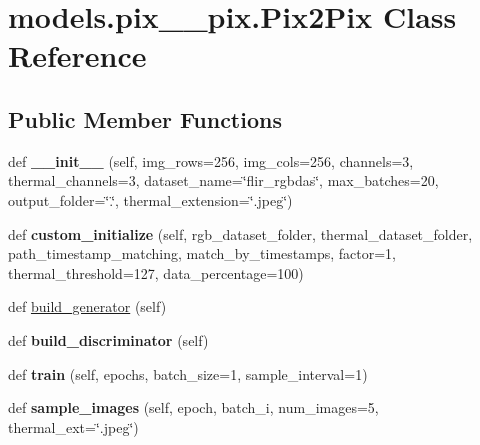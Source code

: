 \hypertarget{classmodels_1_1pix__2__pix_1_1Pix2Pix}{}\section{models.\+pix\+\_\+\_\+pix.\+Pix2\+Pix Class Reference}
\label{classmodels_1_1pix__2__pix_1_1Pix2Pix}
\subsection*{Public Member Functions}
\begin{DoxyCompactItemize}
\item 
\mbox{\label{classmodels_1_1pix__2__pix_1_1Pix2Pix_a865c73fee64a2fc6edd73713e129e2c4}} 
def {\bfseries \+\_\+\+\_\+init\+\_\+\+\_\+} (self, img\+\_\+rows=256, img\+\_\+cols=256, channels=3, thermal\+\_\+channels=3, dataset\+\_\+name=\char`\"{}flir\+\_\+rgbdas\char`\"{}, max\+\_\+batches=20, output\+\_\+folder=\char`\"{}.\char`\"{}, thermal\+\_\+extension=\char`\"{}.jpeg\char`\"{})
\item 
\mbox{\label{classmodels_1_1pix__2__pix_1_1Pix2Pix_a74507f8ee4b614519b001d82d4b56e8a}} 
def {\bfseries custom\+\_\+initialize} (self, rgb\+\_\+dataset\+\_\+folder, thermal\+\_\+dataset\+\_\+folder, path\+\_\+timestamp\+\_\+matching, match\+\_\+by\+\_\+timestamps, factor=1, thermal\+\_\+threshold=127, data\+\_\+percentage=100)
\item 
def \hyperlink{classmodels_1_1pix__2__pix_1_1Pix2Pix_a12423923b4b88603514bd31c9a3eab6c}{build\+\_\+generator} (self)
\item 
\mbox{\label{classmodels_1_1pix__2__pix_1_1Pix2Pix_a9b29b3947199c18699e68ae3ccdfcee4}} 
def {\bfseries build\+\_\+discriminator} (self)
\item 
\mbox{\label{classmodels_1_1pix__2__pix_1_1Pix2Pix_ad3faabaa9fc37f189e45acd0d58bd150}} 
def {\bfseries train} (self, epochs, batch\+\_\+size=1, sample\+\_\+interval=1)
\item 
\mbox{\label{classmodels_1_1pix__2__pix_1_1Pix2Pix_aad55a7c039520eca8ea393fd04a51968}} 
def {\bfseries sample\+\_\+images} (self, epoch, batch\+\_\+i, num\+\_\+images=5, thermal\+\_\+ext=\char`\"{}.jpeg\char`\"{})
\end{DoxyCompactItemize}
